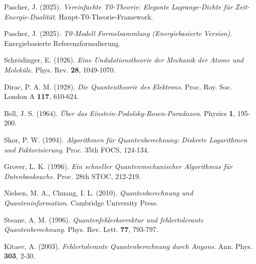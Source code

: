 \documentclass[12pt,a4paper]{article}
\theoremstyle{definition}
\theoremstyle{remark}
\begin{document}
\begin{thebibliography}{99}
	Pascher, J. (2025). \textit{Vereinfachte T0-Theorie: Elegante Lagrange-Dichte f{\"u}r Zeit-Energie-Dualit{\"a}t}. Haupt-T0-Theorie-Framework.
	
	Pascher, J. (2025). \textit{T0-Modell Formelsammlung (Energiebasierte Version)}. Energiebasierte Referenzformulierung.
	
	Schr{\"o}dinger, E. (1926). \textit{Eine Undulationstheorie der Mechanik der Atome und Molek{\"u}le}. Phys. Rev. \textbf{28}, 1049-1070.
	
	Dirac, P. A. M. (1928). \textit{Die Quantentheorie des Elektrons}. Proc. Roy. Soc. London A \textbf{117}, 610-624.
	
	Bell, J. S. (1964). \textit{{\"U}ber das Einstein-Podolsky-Rosen-Paradoxon}. Physics \textbf{1}, 195-200.
	
	Shor, P. W. (1994). \textit{Algorithmen f{\"u}r Quantenberechnung: Diskrete Logarithmen und Faktorisierung}. Proc. 35th FOCS, 124-134.
	
	Grover, L. K. (1996). \textit{Ein schneller Quantenmechanischer Algorithmus f{\"u}r Datenbanksuche}. Proc. 28th STOC, 212-219.
	
	Nielsen, M. A., Chuang, I. L. (2010). \textit{Quantenberechnung und Quanteninformation}. Cambridge University Press.
	
	Steane, A. M. (1996). \textit{Quantenfehlerkorrektur und fehlertolerante Quantenberechnung}. Phys. Rev. Lett. \textbf{77}, 793-797.
	
	Kitaev, A. (2003). \textit{Fehlertolerante Quantenberechnung durch Anyons}. Ann. Phys. \textbf{303}, 2-30.
\end{thebibliography}
\end{document}
